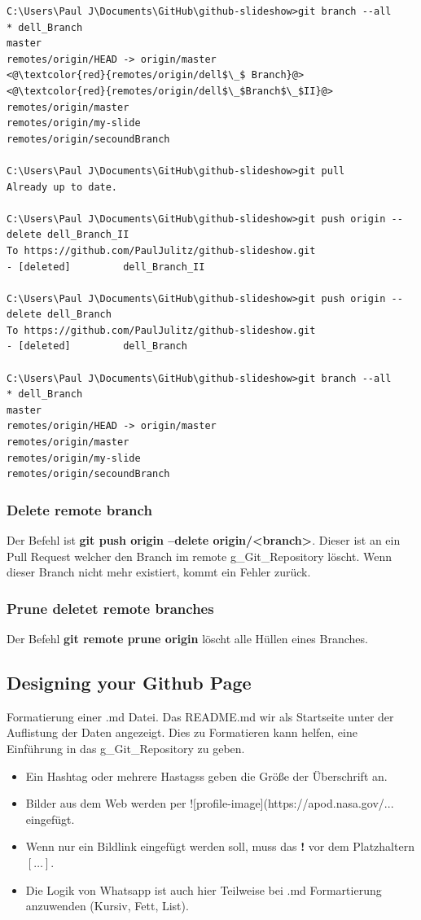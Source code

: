 \begin{lstlisting}[style=CMD]
C:\Users\Paul J\Documents\GitHub\github-slideshow>git branch --all
* dell_Branch
master
remotes/origin/HEAD -> origin/master
<@\textcolor{red}{remotes/origin/dell$\_$ Branch}@>
<@\textcolor{red}{remotes/origin/dell$\_$Branch$\_$II}@>
remotes/origin/master
remotes/origin/my-slide
remotes/origin/secoundBranch

C:\Users\Paul J\Documents\GitHub\github-slideshow>git pull
Already up to date.

C:\Users\Paul J\Documents\GitHub\github-slideshow>git push origin --delete dell_Branch_II
To https://github.com/PaulJulitz/github-slideshow.git
- [deleted]         dell_Branch_II

C:\Users\Paul J\Documents\GitHub\github-slideshow>git push origin --delete dell_Branch
To https://github.com/PaulJulitz/github-slideshow.git
- [deleted]         dell_Branch

C:\Users\Paul J\Documents\GitHub\github-slideshow>git branch --all
* dell_Branch
master
remotes/origin/HEAD -> origin/master
remotes/origin/master
remotes/origin/my-slide
remotes/origin/secoundBranch
\end{lstlisting}

\subsubsection{Delete remote branch}
Der Befehl ist \textbf{git push origin --delete origin/<branch>}. Dieser ist an ein Pull Request welcher den Branch im remote \gls{g_Git_Repository} löscht. Wenn dieser Branch nicht mehr existiert, kommt ein Fehler zurück.

\subsubsection{Prune deletet remote branches}
Der Befehl \textbf{git remote prune origin} löscht alle Hüllen eines Branches.

\subsection{Designing your Github Page}
Formatierung einer .md Datei. Das README.md wir als Startseite unter der Auflistung der Daten angezeigt. Dies zu Formatieren kann helfen, eine Einführung in das \gls{g_Git_Repository} zu geben.
\begin{itemize}
	\item Ein Hashtag oder mehrere Hastagss geben die Größe der Überschrift an. 
	\item Bilder aus dem Web werden per ![profile-image](https://apod.nasa.gov/...%
	eingefügt.
	\item Wenn nur ein Bildlink eingefügt werden soll, muss das \textbf{!} vor dem Platzhaltern $[\dots]$. 
	\item Die Logik von Whatsapp ist auch hier Teilweise bei .md Formartierung anzuwenden (Kursiv, Fett, List).
\end{itemize} 

